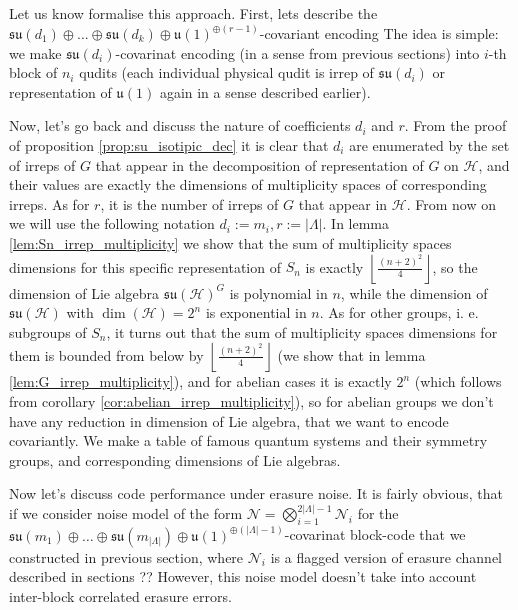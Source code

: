 \documentclass[twocolumn,superscriptaddress,aps,showpacs,amsmath,amstex,amssymb,citeautoscript,floatfix,pra,preprintnumbers]{revtex4-2}
\newcounter{alg}
\theoremstyle{plain}
\theoremstyle{plain}
\theoremstyle{plain}
\theoremstyle{plain}
\theoremstyle{plain}
\theoremstyle{plain}
\begin{document}
Let us know formalise this approach. First, lets describe the $\mathfrak{su}(d_1)\oplus...\oplus\mathfrak{su}(d_k)\oplus \mathfrak{u}(1)^{\oplus(r-1)}$-covariant encoding
The idea is simple: we make $\mathfrak{su}(d_i)$-covarinat encoding 
(in a sense from previous sections) into $i$-th block of $n_i$ qudits (each individual physical qudit is irrep of $\mathfrak{su}(d_i)$ or representation of $\mathfrak{u}(1)$ again in a sense described earlier).

Now, let's go back and discuss the nature of coefficients $d_i$ and $r$. From the proof of proposition \ref{prop:su_isotipic_dec} it is clear
that $d_i$ are enumerated by the set of irreps of $G$ that appear in the decomposition of representation of $G$ on $\mathcal{H}$, and their values
are exactly the dimensions of multiplicity spaces of corresponding irreps. As for $r$, it is the number of irreps of $G$ that appear in $\mathcal{H}$.
From now on we will use the following notation $d_i:= m_i, r:=|\Lambda|$. In lemma \ref{lem:Sn_irrep_multiplicity} we show that the sum of multiplicity 
spaces dimensions for this specific representation of $S_n$ is exactly $\left\lfloor\frac{(n+2)^2}{4}\right\rfloor$,
so the dimension of Lie algebra $\mathfrak{su}(\mathcal{H})^G$ is polynomial in $n$, while the dimension of $\mathfrak{su}(\mathcal{H})$ with $\operatorname{dim}(\mathcal{H})=2^n$ is exponential in $n$.  As for other groups, i. e. subgroups of $S_n$, it turns out that the sum of multiplicity spaces dimensions for them
is bounded from below by $\left\lfloor\frac{(n+2)^2}{4}\right\rfloor$ (we show that in lemma \ref{lem:G_irrep_multiplicity}), 
and for abelian cases it is exactly $2^n$ (which follows from corollary \ref{cor:abelian_irrep_multiplicity}), 
so for abelian groups we don't have any reduction in dimension of Lie algebra, that
we want to encode covariantly. We make a table of famous quantum systems and 
their symmetry groups, and corresponding dimensions of Lie algebras.

Now let's discuss code performance under erasure noise. It is fairly obvious, that if we consider noise model of the form $\mathcal{N}=\bigotimes_{i=1}^{2|\Lambda|-1}\mathcal{N}_i$ for the $\mathfrak{s} \mathfrak{u}\left(m_1\right) \oplus \ldots \oplus \mathfrak{s} \mathfrak{u}\left(m_{|\Lambda|}\right) \oplus \mathfrak{u}(1)^{\oplus(|\Lambda|-1)}$-covarinat
block-code that we constructed in previous section, where $\mathcal{N}_i$ is a flagged version of erasure channel described in sections ??
However, this noise model doesn't take into account inter-block correlated erasure 
errors.
\end{document}
